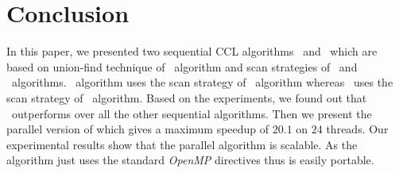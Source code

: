 \section{Conclusion}
\label{conclusion}
In this paper, we presented two sequential CCL algorithms \remsp\ and \aremsp\
which are based on union-find technique of \rems\ algorithm and scan strategies 
of \arun\ and \lrpc\ algorithms. \remsp\ algorithm uses the scan strategy of
\lrpc\ algorithm whereas \arun\ uses the scan strategy of \arun\ algorithm.
Based on the experiments, we found out that \aremsp\ outperforms over all the
other sequential algorithms. Then we present the parallel version of \aremsp
which gives a maximum speedup of $20.1$ on $24$ threads. Our experimental
results show that the parallel algorithm is scalable. As the algorithm just uses
the standard {\em OpenMP} directives thus is easily portable.

